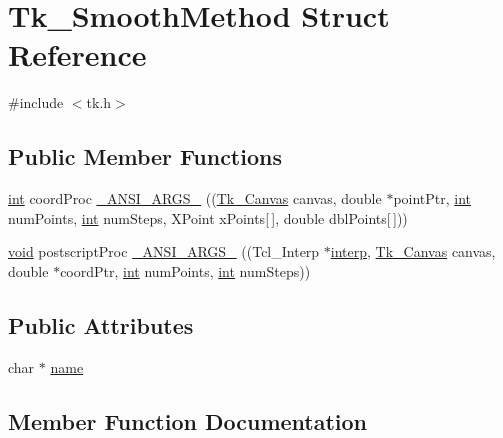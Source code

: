 \hypertarget{struct_tk___smooth_method}{}\section{Tk\+\_\+\+Smooth\+Method Struct Reference}
\label{struct_tk___smooth_method}


{\ttfamily \#include $<$tk.\+h$>$}

\subsection*{Public Member Functions}
\begin{DoxyCompactItemize}
\item 
\hyperlink{tk_8h_a83f82f76e7fed06f4c49d2db94028a6d}{int} coord\+Proc \hyperlink{struct_tk___smooth_method_a888296e3081c3160a9469fdd82cd2fde}{\+\_\+\+A\+N\+S\+I\+\_\+\+A\+R\+G\+S\+\_\+} ((\hyperlink{tk_8h_a48928ad64693bd6179f628ad883f3250}{Tk\+\_\+\+Canvas} canvas, double $\ast$point\+Ptr, \hyperlink{tk_8h_a83f82f76e7fed06f4c49d2db94028a6d}{int} num\+Points, \hyperlink{tk_8h_a83f82f76e7fed06f4c49d2db94028a6d}{int} num\+Steps, X\+Point x\+Points\mbox{[}$\,$\mbox{]}, double dbl\+Points\mbox{[}$\,$\mbox{]}))
\item 
\hyperlink{tk_8h_aba408b7cd755a96426e004c015f5de8e}{void} postscript\+Proc \hyperlink{struct_tk___smooth_method_a9281803d81c494b47e06852300a9775b}{\+\_\+\+A\+N\+S\+I\+\_\+\+A\+R\+G\+S\+\_\+} ((Tcl\+\_\+\+Interp $\ast$\hyperlink{tk_8h_a5ab79c0f5849ee8e6a2e955a6c536cc0}{interp}, \hyperlink{tk_8h_a48928ad64693bd6179f628ad883f3250}{Tk\+\_\+\+Canvas} canvas, double $\ast$coord\+Ptr, \hyperlink{tk_8h_a83f82f76e7fed06f4c49d2db94028a6d}{int} num\+Points, \hyperlink{tk_8h_a83f82f76e7fed06f4c49d2db94028a6d}{int} num\+Steps))
\end{DoxyCompactItemize}
\subsection*{Public Attributes}
\begin{DoxyCompactItemize}
\item 
char $\ast$ \hyperlink{struct_tk___smooth_method_a538eaa7a8b35a3ad3683c951c83b9753}{name}
\end{DoxyCompactItemize}


\subsection{Member Function Documentation}
